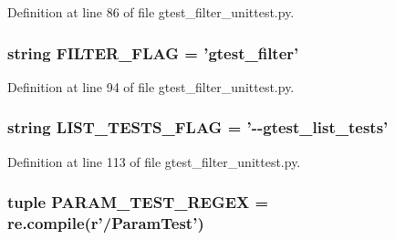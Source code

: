\-Definition at line 86 of file gtest\-\_\-filter\-\_\-unittest.\-py.

\hypertarget{namespacegtest__filter__unittest_a4e1a92405aa6d661157f2f8498692796}{
\subsubsection[{\-F\-I\-L\-T\-E\-R\-\_\-\-F\-L\-A\-G}]{\setlength{\rightskip}{0pt plus 5cm}string {\bf \-F\-I\-L\-T\-E\-R\-\_\-\-F\-L\-A\-G} = 'gtest\-\_\-filter'}}\label{d5/dea/namespacegtest__filter__unittest_a4e1a92405aa6d661157f2f8498692796}


\-Definition at line 94 of file gtest\-\_\-filter\-\_\-unittest.\-py.

\hypertarget{namespacegtest__filter__unittest_a6bd797257f4db78c152b6e62341177db}{
\subsubsection[{\-L\-I\-S\-T\-\_\-\-T\-E\-S\-T\-S\-\_\-\-F\-L\-A\-G}]{\setlength{\rightskip}{0pt plus 5cm}string {\bf \-L\-I\-S\-T\-\_\-\-T\-E\-S\-T\-S\-\_\-\-F\-L\-A\-G} = '-\/-\/gtest\-\_\-list\-\_\-tests'}}\label{d5/dea/namespacegtest__filter__unittest_a6bd797257f4db78c152b6e62341177db}


\-Definition at line 113 of file gtest\-\_\-filter\-\_\-unittest.\-py.

\hypertarget{namespacegtest__filter__unittest_a7fe91f4f3bcf106f17e0d1f1774b6ae3}{
\subsubsection[{\-P\-A\-R\-A\-M\-\_\-\-T\-E\-S\-T\-\_\-\-R\-E\-G\-E\-X}]{\setlength{\rightskip}{0pt plus 5cm}tuple {\bf \-P\-A\-R\-A\-M\-\_\-\-T\-E\-S\-T\-\_\-\-R\-E\-G\-E\-X} = re.\-compile(r'/\-Param\-Test')}}\label{d5/dea/namespacegtest__filter__unittest_a7fe91f4f3bcf106f17e0d1f1774b6ae3}



